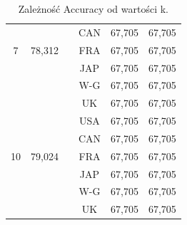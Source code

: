 \documentclass{classrep}
\begin{document}
\begin{table}[h!]
\begin{tabular} {c c c c c c}
		&			&\vline& CAN & 67,705 & 67,705 \\
		7 & 78,312 	&\vline& FRA & 67,705 & 67,705 \\
		&			&\vline& JAP & 67,705 & 67,705 \\
		&			&\vline& W-G & 67,705 & 67,705 \\
		&			&\vline& UK  & 67,705 & 67,705 \\
		\hline 
		&   		&\vline& USA & 67,705 & 67,705 \\
		&			&\vline& CAN & 67,705 & 67,705 \\
		10 & 79,024 &\vline& FRA & 67,705 & 67,705 \\
		&			&\vline& JAP & 67,705 & 67,705 \\
		&			&\vline& W-G & 67,705 & 67,705 \\
		&			&\vline& UK  & 67,705 & 67,705 \\

		\hline
	\end{tabular}
	\caption{Zależność Accuracy od wartości k. }
	\label{tabelaK}
\end{table}
\end{document}
